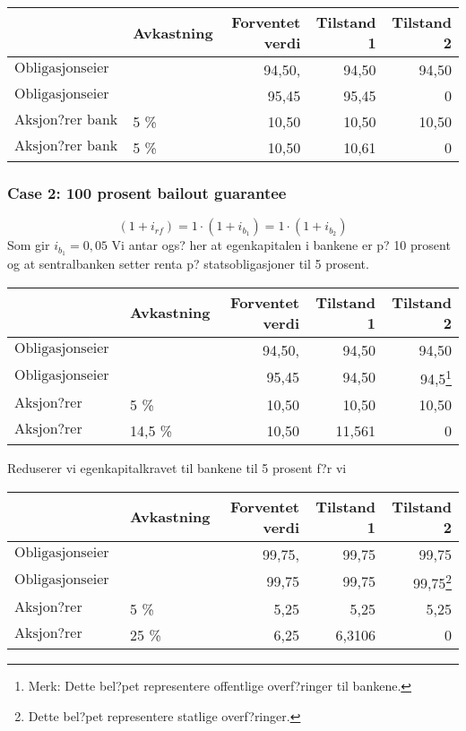 \documentclass[a4paper,notitlepage]{article}
\begin{document}
\begin{center}
\begin{tabular}{llrrr}
\hline
      & Avkastning& Forventet verdi & Tilstand 1 & Tilstand 2 \\
\hline
$\text{Obligasjonseier bank 1 }$  &  &   94,50, & 94,50 & 94,50 \\
$\text{Obligasjonseier bank 2}$ &        & 95,45 & 95,45 & 0 \\
$\text{Aksjon?rer bank 1}$    &  5 \% &     10,50 & 10,50 & 10,50 \\
$\text{Aksjon?rer bank 2}$    &  5 \% &     10,50 & 10,61 & 0 \\

\end{tabular}
\end{center}

\subsubsection{Case 2: 100 prosent bailout guarantee}
\begin{equation*}
(1+i_{rf})=1\cdot (1+i_{b_{1}})=1\cdot (1+i_{b_{2}})
\end{equation*}
Som gir $i_{b_{1}}=0,05$
Vi antar ogs? her at egenkapitalen i bankene er p? 10 prosent og at sentralbanken setter renta p? statsobligasjoner til 5 prosent.
\begin{center}
\begin{tabular}{llrrr}
\hline
      & Avkastning& Forventet verdi & Tilstand 1 & Tilstand 2 \\
\hline
$\text{Obligasjonseier bank 1}$  & &   94,50, & 94,50 & 94,50 \\
$\text{Obligasjonseier bank 2}$ &        & 95,45 & 94,50 & 94,5\footnote{Merk: Dette bel?pet representere offentlige overf?ringer til bankene.} \\
$\text{Aksjon?rer bank 1}$    &  5 \% &     10,50 & 10,50 & 10,50 \\
$\text{Aksjon?rer bank 2}$    &  14,5 \% &     10,50 & 11,561 & 0 \\
\end{tabular}
\end{center}
Reduserer vi egenkapitalkravet til bankene til 5 prosent f?r vi
\begin{center}
\begin{tabular}{llrrr}
\hline
      & Avkastning& Forventet verdi & Tilstand 1 & Tilstand 2 \\
\hline
$\text{Obligasjonseier bank 1}$  & &   99,75, & 99,75 & 99,75 \\
$\text{Obligasjonseier bank 2}$ &        & 99,75 & 99,75 & 99,75\footnote{Dette bel?pet representere statlige overf?ringer.} \\
$\text{Aksjon?rer bank 1}$    &  5 \% &     5,25 & 5,25 & 5,25 \\
$\text{Aksjon?rer bank 2}$    &  25 \% &     6,25 & 6,3106 & 0 \\
\end{tabular}
\end{center}
\end{document}
